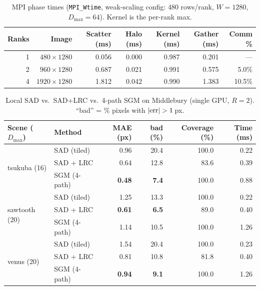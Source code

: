 \documentclass[11pt]{article}
\begin{document}
\begin{table}[H]
\centering
\caption{MPI phase times (\texttt{MPI\_Wtime}, weak-scaling config: 480 rows/rank,
$W{=}1280$, $D_{\max}{=}64$). Kernel is the per-rank max.}
\label{tab:phases}
\begin{tabular}{rrrrrrr}
\toprule
Ranks & Image & Scatter (ms) & Halo (ms) & Kernel (ms) & Gather (ms) & Comm \% \\
\midrule
1 & $480{\times}1280$  & 0.056 & 0.000 & 0.987 & 0.201 & --- \\
2 & $960{\times}1280$  & 0.687 & 0.021 & 0.991 & 0.575 & \phantom{0}5.0\% \\
4 & $1920{\times}1280$ & 1.812 & 0.042 & 0.990 & 1.383 & 10.5\% \\
\bottomrule
\end{tabular}
\end{table}

\begin{table}[H]
\centering
\caption{Local SAD vs.\ SAD+LRC vs.\ 4-path SGM on Middlebury (single GPU,
$R{=}2$). ``bad'' = \% pixels with $|{\rm err}|>1$\,px.}
\label{tab:accuracy}
\begin{tabular}{llrrrr}
\toprule
Scene ($D_{\max}$) & Method & MAE (px) & bad (\%) & Coverage (\%) & Time (ms)\\
\midrule
\multirow{3}{*}{tsukuba (16)}
 & SAD (tiled)  & 0.96 & 20.4 & 100.0 & 0.22\\
 & SAD + LRC    & 0.64 & 12.8 & \phantom{0}83.6 & 0.39\\
 & SGM (4-path) & \textbf{0.48} & \textbf{7.4} & 100.0 & 0.88\\
\midrule
\multirow{3}{*}{sawtooth (20)}
 & SAD (tiled)  & 1.25 & 13.3 & 100.0 & 0.22\\
 & SAD + LRC    & \textbf{0.61} & \textbf{6.5} & \phantom{0}89.0 & 0.40\\
 & SGM (4-path) & 1.14 & 10.5 & 100.0 & 1.26\\
\midrule
\multirow{3}{*}{venus (20)}
 & SAD (tiled)  & 1.54 & 20.4 & 100.0 & 0.23\\
 & SAD + LRC    & 0.81 & 10.8 & \phantom{0}81.8 & 0.40\\
 & SGM (4-path) & \textbf{0.94} & \textbf{9.1} & 100.0 & 1.26\\
\bottomrule
\end{tabular}
\end{table}
\end{document}
